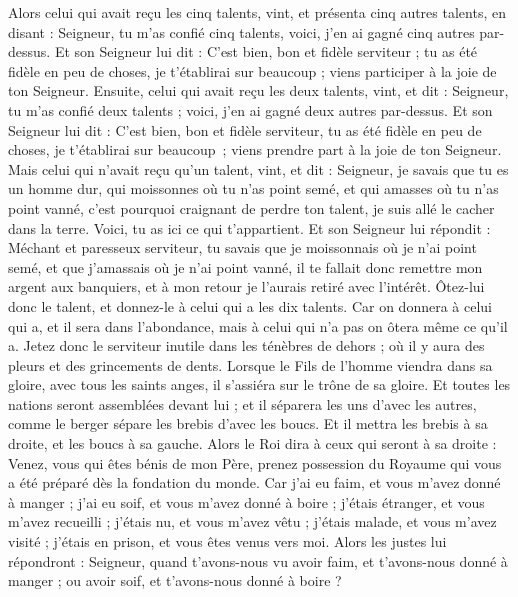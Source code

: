 \begin{multicols}{2}
{Alors celui qui avait reçu les cinq talents, vint, et présenta cinq autres talents, en disant : Seigneur, tu m'as confié cinq talents, voici, j'en ai gagné cinq autres par-dessus.
Et son Seigneur lui dit : C’est bien, bon et fidèle serviteur ; tu as été fidèle en peu de choses, je t'établirai sur beaucoup ; viens participer à la joie de ton Seigneur.
Ensuite, celui qui avait reçu les deux talents, vint, et dit : Seigneur, tu m'as confié deux talents ; voici, j'en ai gagné deux autres par-dessus.
Et son Seigneur lui dit : C’est bien, bon et fidèle serviteur, tu as été fidèle en peu de choses, je t'établirai sur beaucoup ; viens prendre part à la joie de ton Seigneur.
Mais celui qui n'avait reçu qu'un talent, vint, et dit : Seigneur, je savais que tu es un homme dur, qui moissonnes où tu n'as point semé, et qui amasses où tu n'as point vanné,
c'est pourquoi craignant de perdre ton talent, je suis allé le cacher dans la terre. Voici, tu as ici ce qui t'appartient.
Et son Seigneur lui répondit : Méchant et paresseux serviteur, tu savais que je moissonnais où je n'ai point semé, et que j'amassais où je n'ai point vanné,
il te fallait donc remettre mon argent aux banquiers, et à mon retour je l'aurais retiré avec l'intérêt.
Ôtez-lui donc le talent, et donnez-le à celui qui a les dix talents.
Car on donnera à celui qui a, et il sera dans l’abondance, mais à celui qui n’a pas on ôtera même ce qu’il a.
Jetez donc le serviteur inutile dans les ténèbres de dehors ; où il y aura des pleurs et des grincements de dents.
Lorsque le Fils de l'homme viendra dans sa gloire, avec tous les saints anges, il s'assiéra sur le trône de sa gloire.
Et toutes les nations seront assemblées devant lui ; et il séparera les uns d'avec les autres, comme le berger sépare les brebis d'avec les boucs.
Et il mettra les brebis à sa droite, et les boucs à sa gauche.
Alors le Roi dira à ceux qui seront à sa droite : Venez, vous qui êtes bénis de mon Père, prenez possession du Royaume qui vous a été préparé dès la fondation du monde.
Car j'ai eu faim, et vous m'avez donné à manger ; j'ai eu soif, et vous m'avez donné à boire ; j'étais étranger, et vous m'avez recueilli ;
j'étais nu, et vous m'avez vêtu ; j'étais malade, et vous m'avez visité ; j'étais en prison, et vous êtes venus vers moi.
Alors les justes lui répondront : Seigneur, quand t'avons-nous vu avoir faim, et t'avons-nous donné à manger ; ou avoir soif, et t'avons-nous donné à boire ?
}
\end{multicols}
